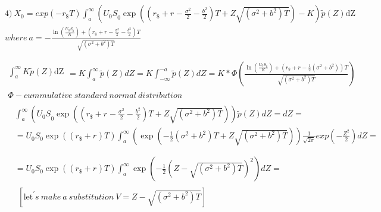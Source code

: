 \documentclass[12pt, a4paper]{article}
\begin{document}
\begin{enumerate}
\[\begin{matrix}
\begin{matrix}
\begin{matrix}
\begin{matrix}
\begin{matrix}
4)\ X_{0} = exp\left( - r_{\$}T \right)\int_{a}^{\infty}{\left( {U_{0}S}_{0}\exp\left( \left( r_{\$} + r_{} - \frac{\sigma^{2}}{2} - \frac{b^{2}}{2} \right)T + Z\sqrt{\left( \sigma^{2} + b^{2} \right)T} \right) - K \right)\tilde{p}\left( Z \right)}\text{dZ} \\
where\ a = - \frac{\ln\left( \frac{{U_{0}S}_{0}}{K} \right) + \left( r_{\$} + r_{} - \frac{\sigma^{2}}{2} - \frac{b^{2}}{2} \right)T}{\sqrt{\left( \sigma^{2} + b^{2} \right)T}} \\
\end{matrix} \\
\begin{matrix}
\begin{matrix}
\int_{a}^{\infty}{K\tilde{p}\left( Z \right)}\text{dZ} \\
\end{matrix} = K\int_{a}^{\infty}{\tilde{p}\left( Z \right)}dZ = K\int_{- \infty}^{- a}{\tilde{p}\left( Z \right)}dZ = K*\Phi\left( \frac{\ln\left( \frac{{U_{0}S}_{0}}{K} \right) + \left( r_{\$} + r_{} - \frac{1}{2}\left( \sigma^{2} + b^{2} \right) \right)T}{\sqrt{\left( \sigma^{2} + b^{2} \right)T}} \right) \\
\begin{matrix}
\Phi - cummulative\ standard\ normal\ distribution \\
\begin{matrix}
\begin{matrix}
\int_{a}^{\infty}{\left( {U_{0}S}_{0}\exp\left( \left( r_{\$} + r_{} - \frac{\sigma^{2}}{2} - \frac{b^{2}}{2} \right)T + Z\sqrt{\left( \sigma^{2} + b^{2} \right)T} \right) \right)\tilde{p}\left( Z \right)}dZ = dZ = \\
 = U_{0}S_{0}\exp\left( \left( r_{\$} + r_{} \right)T \right)\int_{a}^{\infty}{\left( \exp\left( - \frac{1}{2}\left( \sigma^{2} + b^{2} \right)T + Z\sqrt{\left( \sigma^{2} + b^{2} \right)T} \right) \right)\frac{1}{\sqrt{2\pi}}exp\left( - \frac{Z^{2}}{2} \right)}dZ = \\
\end{matrix} \\
\begin{matrix}
 = U_{0}S_{0}\exp\left( \left( r_{\$} + r_{} \right)T \right)\int_{a}^{\infty}{\exp\left( - \frac{1}{2}\left( Z - \sqrt{\left( \sigma^{2} + b^{2} \right)T} \right)^{2} \right)}dZ = \\
\begin{matrix}
\left\lbrack \text{let}^{'}s\ make\ a\ substitution\ V = Z - \sqrt{\left( \sigma^{2} + b^{2} \right)T} \right\rbrack \\

\end{matrix}
\end{matrix}
\end{matrix}
\end{matrix}
\end{matrix}
\end{matrix}
\end{matrix}
\end{matrix}
\end{matrix}\]
\end{enumerate}
\end{document}
